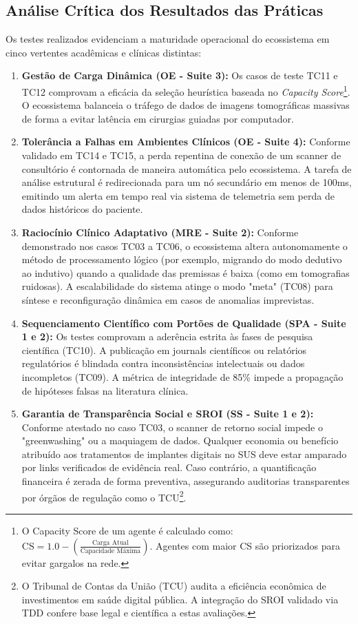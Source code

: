 \subsection{Análise Crítica dos Resultados das Práticas}

Os testes realizados evidenciam a maturidade operacional do ecossistema em cinco vertentes acadêmicas e clínicas distintas:

\begin{enumerate}
    \item \textbf{Gestão de Carga Dinâmica (OE - Suite 3):} Os casos de teste TC11 e TC12 comprovam a eficácia da seleção heurística baseada no \textit{Capacity Score}\footnote{O Capacity Score de um agente é calculado como: $\text{CS} = 1.0 - \left(\frac{\text{Carga Atual}}{\text{Capacidade Máxima}}\right)$. Agentes com maior CS são priorizados para evitar gargalos na rede.}. O ecossistema balanceia o tráfego de dados de imagens tomográficas massivas de forma a evitar latência em cirurgias guiadas por computador.
    \item \textbf{Tolerância a Falhas em Ambientes Clínicos (OE - Suite 4):} Conforme validado em TC14 e TC15, a perda repentina de conexão de um scanner de consultório é contornada de maneira automática pelo ecossistema. A tarefa de análise estrutural é redirecionada para um nó secundário em menos de 100ms, emitindo um alerta em tempo real via sistema de telemetria sem perda de dados históricos do paciente.
    \item \textbf{Raciocínio Clínico Adaptativo (MRE - Suite 2):} Conforme demonstrado nos casos TC03 a TC06, o ecossistema altera autonomamente o método de processamento lógico (por exemplo, migrando do modo dedutivo ao indutivo) quando a qualidade das premissas é baixa (como em tomografias ruidosas). A escalabilidade do sistema atinge o modo "meta" (TC08) para síntese e reconfiguração dinâmica em casos de anomalias imprevistas.
    \item \textbf{Sequenciamento Científico com Portões de Qualidade (SPA - Suite 1 e 2):} Os testes comprovam a aderência estrita às fases de pesquisa científica (TC10). A publicação em journals científicos ou relatórios regulatórios é blindada contra inconsistências intelectuais ou dados incompletos (TC09). A métrica de integridade de 85\% impede a propagação de hipóteses falsas na literatura clínica.
    \item \textbf{Garantia de Transparência Social e SROI (SS - Suite 1 e 2):} Conforme atestado no caso TC03, o scanner de retorno social impede o "greenwashing" ou a maquiagem de dados. Qualquer economia ou benefício atribuído aos tratamentos de implantes digitais no SUS deve estar amparado por links verificados de evidência real. Caso contrário, a quantificação financeira é zerada de forma preventiva, assegurando auditorias transparentes por órgãos de regulação como o TCU\footnote{O Tribunal de Contas da União (TCU) audita a eficiência econômica de investimentos em saúde digital pública. A integração do SROI validado via TDD confere base legal e científica a estas avaliações.}.

\end{enumerate}
